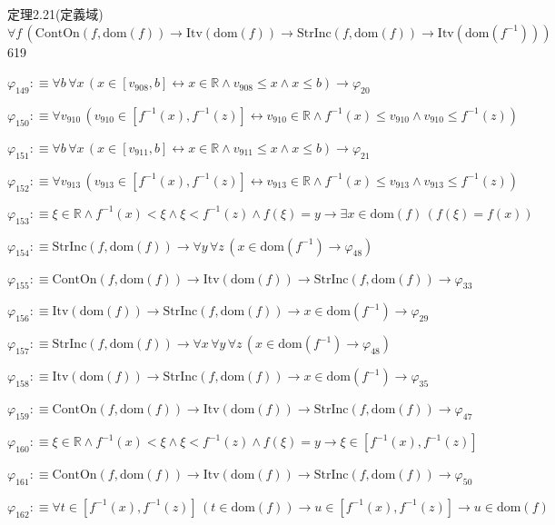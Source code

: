 \begin{fullproof}{定理2.21(定義域)}{$\forall f\,(\mathrm{ContOn}(f,\mathrm{dom}(f)) \to \mathrm{Itv}(\mathrm{dom}(f)) \to \mathrm{StrInc}(f,\mathrm{dom}(f)) \to \mathrm{Itv}(\mathrm{dom}(f^{-1})))$}{619}
\begin{abbrevlist}
\item $\varphi_{149} :\equiv \forall b\,\forall x\,(x \in [v_{908},b] \leftrightarrow x \in \mathbb{R} \land v_{908} \leq x \land x \leq b) \to \varphi_{20}$
\item $\varphi_{150} :\equiv \forall v_{910}\,(v_{910} \in [f^{-1}(x),f^{-1}(z)] \leftrightarrow v_{910} \in \mathbb{R} \land f^{-1}(x) \leq v_{910} \land v_{910} \leq f^{-1}(z))$
\item $\varphi_{151} :\equiv \forall b\,\forall x\,(x \in [v_{911},b] \leftrightarrow x \in \mathbb{R} \land v_{911} \leq x \land x \leq b) \to \varphi_{21}$
\item $\varphi_{152} :\equiv \forall v_{913}\,(v_{913} \in [f^{-1}(x),f^{-1}(z)] \leftrightarrow v_{913} \in \mathbb{R} \land f^{-1}(x) \leq v_{913} \land v_{913} \leq f^{-1}(z))$
\item $\varphi_{153} :\equiv \xi \in \mathbb{R} \land f^{-1}(x) < \xi \land \xi < f^{-1}(z) \land f(\xi) = y \to \exists x \in \mathrm{dom}(f)\,(f(\xi) = f(x))$
\item $\varphi_{154} :\equiv \mathrm{StrInc}(f,\mathrm{dom}(f)) \to \forall y\,\forall z\,(x \in \mathrm{dom}(f^{-1}) \to \varphi_{48})$
\item $\varphi_{155} :\equiv \mathrm{ContOn}(f,\mathrm{dom}(f)) \to \mathrm{Itv}(\mathrm{dom}(f)) \to \mathrm{StrInc}(f,\mathrm{dom}(f)) \to \varphi_{33}$
\item $\varphi_{156} :\equiv \mathrm{Itv}(\mathrm{dom}(f)) \to \mathrm{StrInc}(f,\mathrm{dom}(f)) \to x \in \mathrm{dom}(f^{-1}) \to \varphi_{29}$
\item $\varphi_{157} :\equiv \mathrm{StrInc}(f,\mathrm{dom}(f)) \to \forall x\,\forall y\,\forall z\,(x \in \mathrm{dom}(f^{-1}) \to \varphi_{48})$
\item $\varphi_{158} :\equiv \mathrm{Itv}(\mathrm{dom}(f)) \to \mathrm{StrInc}(f,\mathrm{dom}(f)) \to x \in \mathrm{dom}(f^{-1}) \to \varphi_{35}$
\item $\varphi_{159} :\equiv \mathrm{ContOn}(f,\mathrm{dom}(f)) \to \mathrm{Itv}(\mathrm{dom}(f)) \to \mathrm{StrInc}(f,\mathrm{dom}(f)) \to \varphi_{47}$
\item $\varphi_{160} :\equiv \xi \in \mathbb{R} \land f^{-1}(x) < \xi \land \xi < f^{-1}(z) \land f(\xi) = y \to \xi \in [f^{-1}(x),f^{-1}(z)]$
\item $\varphi_{161} :\equiv \mathrm{ContOn}(f,\mathrm{dom}(f)) \to \mathrm{Itv}(\mathrm{dom}(f)) \to \mathrm{StrInc}(f,\mathrm{dom}(f)) \to \varphi_{50}$
\item $\varphi_{162} :\equiv \forall t \in [f^{-1}(x),f^{-1}(z)]\,(t \in \mathrm{dom}(f)) \to u \in [f^{-1}(x),f^{-1}(z)] \to u \in \mathrm{dom}(f)$

\end{abbrevlist}
\end{fullproof}
